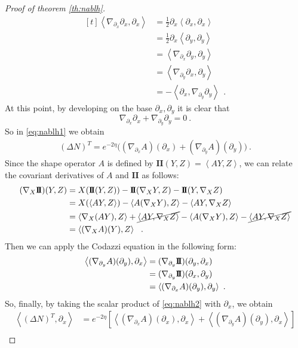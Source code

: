 \documentclass[a4paper,11pt,openright,twoside]{book}
\newcommand{\II}{\mathbf{I\!I}}
\newcommand{\1}{\mathds{1}}
\theoremstyle{plain}
\theoremstyle{definition}
\theoremstyle{remark}
\begin{document}
\begin{proof}[Proof of theorem \ref{th:nablh}]
\[\begin{aligned}[t]
	\text{}\left<\nabla_{\partial_x}\partial_x,\partial_x \right>
	&= \frac{1}{2}\partial_x\left<\partial_x,\partial_x \right> \\
	&= \frac{1}{2}\partial_x\left<\partial_y,\partial_y \right> \\
	&= \left<\nabla_{\partial_x}\partial_y,\partial_y \right> \\
	&= \left<\nabla_{\partial_y}\partial_x,\partial_y \right> \\
	&= -\left<\partial_x,\nabla_{\partial_y}\partial_y \right>
	\ \ .
	\end{aligned}
	\]
	At this point, by developing on the base $\partial_x,\partial_y$ it is clear that
	 \[\nabla_{\partial_x}\partial_x+\nabla_{\partial_y}\partial_y=0\ .\]
	So in \eqref{eq:nablh1} we obtain
	\begin{align}\label{eq:nablh2}
		(\Delta N)^T
		=
		e^{-2\eta}\bigl((\nabla_{\partial_x}A)(\partial_x)+(\nabla_{\partial_y}A)(\partial_y)\bigr)
	\ . 
	\end{align}
	Since the shape operator $A$ is defined by $\II(Y,Z) = \left<AY,Z \right>$, we can relate the covariant derivatives of $A$ and $\II$ as follows:
	\begin{align*}
		(\nabla_X\II) (Y,Z)  &= X(\II(Y,Z)) -\II(\nabla_XY,Z)-\II(Y,\nabla_X Z) \\
		&= X(\left<AY,Z \right>)-\left<A(\nabla_X Y),Z \right>-\left<AY,\nabla_XZ \right> \\
		&= \left<\nabla_X(AY),Z \right> + \cancel{\left<AY,\nabla_X Z \right>}-
		\left<A(\nabla_XY),Z \right> -\cancel{\left<AY, \nabla_XZ \right>}\\
		&= \left<(\nabla_XA)(Y),Z \right>
	\ \ . 
	\end{align*}
	Then we can apply the Codazzi equation in the following form:
	\begin{align}\label{eq:nablh3}
		\left<(\nabla_{\partial_y}A)(\partial_y),\partial_x \right> &=  
		(\nabla_{\partial_y}\II) (\partial_y,\partial_x) \notag\\
		&= (\nabla_{\partial_y}\II) (\partial_x,\partial_y) \notag\\
		&= \left< (\nabla_{\partial_x}A)(\partial_y),\partial_y  \right>
	\ . 
	\end{align}
	So, finally, by taking the scalar product of \eqref{eq:nablh2} with $\partial_x$, we obtain
	\begin{align*}
		\left< (\Delta N)^T, \partial_x \right>
		&= e^{-2\eta} \left[ \left< (\nabla_{\partial_x}A) (\partial_x) ,\partial_x \right> + \left< (\nabla_{\partial_y}A) (\partial_y) ,\partial_x \right> \right] \\

\end{align*}
\end{proof}
\end{document}
